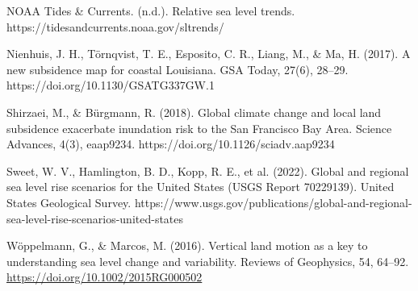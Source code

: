 \documentclass[12pt,paper=a4,DIV=12,parskip=never,chapterprefix=false,headings=standardclasses]{scrreprt}
\begin{document}
NOAA Tides \& Currents. (n.d.). Relative sea level trends. https://tidesandcurrents.noaa.gov/sltrends/

Nienhuis, J. H., Törnqvist, T. E., Esposito, C. R., Liang, M., \& Ma, H. (2017). A new subsidence map for
coastal Louisiana. GSA Today, 27(6), 28–29. https://doi.org/10.1130/GSATG337GW.1

Shirzaei, M., \& Bürgmann, R. (2018). Global climate change and local land subsidence exacerbate
inundation risk to the San Francisco Bay Area. Science Advances, 4(3), eaap9234.
https://doi.org/10.1126/sciadv.aap9234

Sweet, W. V., Hamlington, B. D., Kopp, R. E., et al. (2022). Global and regional sea level rise scenarios
for the United States (USGS Report 70229139). United States Geological Survey.
https://www.usgs.gov/publications/global-and-regional-sea-level-rise-scenarios-united-states

Wöppelmann, G., \& Marcos, M. (2016). Vertical land motion as a key to understanding sea level change
and variability. Reviews of Geophysics, 54, 64–92. \url{https://doi.org/10.1002/2015RG000502}

\endgroup
\end{document}
